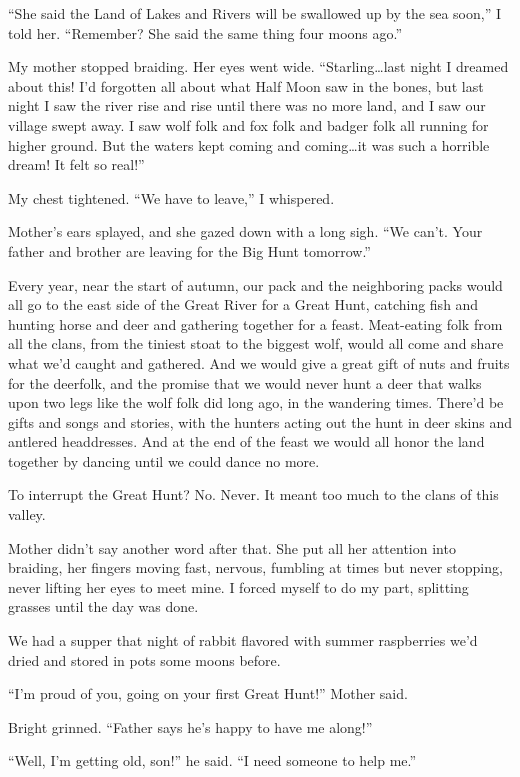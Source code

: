 ``She said the Land of Lakes and Rivers will be swallowed up by the sea soon,'' I told her. ``Remember? She said the same thing four moons ago.''

My mother stopped braiding. Her eyes went wide. ``Starling\ldots{}last night I dreamed about this! I'd forgotten all about what Half Moon saw in the bones, but last night I saw the river rise and rise until there was no more land, and I saw our village swept away. I saw wolf folk and fox folk and badger folk all running for higher ground. But the waters kept coming and coming\ldots{}it was such a horrible dream! It felt so real!''

My chest tightened. ``We have to leave,'' I whispered.

Mother's ears splayed, and she gazed down with a long sigh. ``We can't. Your father and brother are leaving for the Big Hunt tomorrow.''

Every year, near the start of autumn, our pack and the neighboring packs would all go to the east side of the Great River for a Great Hunt, catching fish and hunting horse and deer and gathering together for a feast. Meat-eating folk from all the clans, from the tiniest stoat to the biggest wolf, would all come and share what we'd caught and gathered. And we would give a great gift of nuts and fruits for the deerfolk, and the promise that we would never hunt a deer that walks upon two legs like the wolf folk did long ago, in the wandering times. There'd be gifts and songs and stories, with the hunters acting out the hunt in deer skins and antlered headdresses. And at the end of the feast we would all honor the land together by dancing until we could dance no more.

To interrupt the Great Hunt? No. Never. It meant too much to the clans of this valley.

Mother didn't say another word after that. She put all her attention into braiding, her fingers moving fast, nervous, fumbling at times but never stopping, never lifting her eyes to meet mine. I forced myself to do my part, splitting grasses until the day was done.

We had a supper that night of rabbit flavored with summer raspberries we'd dried and stored in pots some moons before.

``I'm proud of you, going on your first Great Hunt!'' Mother said.

Bright grinned. ``Father says he's happy to have me along!''

``Well, I'm getting old, son!'' he said. ``I need someone to help me.''

